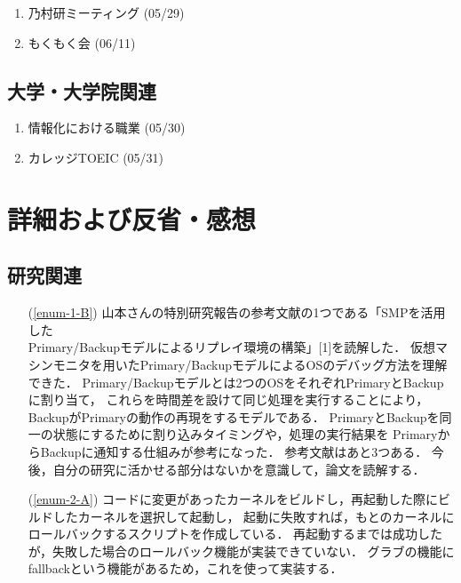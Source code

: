 \documentclass[fleqn, 14pt]{extarticle}
\begin{document}
\begin{enumerate}
\item 乃村研ミーティング
\hfill
\label{enum-laboratory1}
(05/29)
\item もくもく会
\hfill
\label{enum-laboratory4}
(06/11)
\end{enumerate}

\subsection{大学・大学院関連}
\label{sec-2-3}

\begin{enumerate}
\item 情報化における職業
\hfill
\label{enum-univ1}
(05/30)
\item カレッジTOEIC
\hfill
\label{enum-univ2}
(05/31)
\end{enumerate}





\section{詳細および反省・感想}
\label{sec-3}
\subsection{研究関連}
\label{sec-3-1}

\begin{itemize}
\item[(\ref{enum-1-B})]
山本さんの特別研究報告の参考文献の1つである「SMPを活用した \\
Primary/Backupモデルによるリプレイ環境の構築」[1]を読解した．
仮想マシンモニタを用いたPrimary/BackupモデルによるOSのデバッグ方法を理解できた．
Primary/Backupモデルとは2つのOSをそれぞれPrimaryとBackupに割り当て，
これらを時間差を設けて同じ処理を実行することにより，BackupがPrimaryの動作の再現をするモデルである．
PrimaryとBackupを同一の状態にするために割り込みタイミングや，処理の実行結果を
PrimaryからBackupに通知する仕組みが参考になった．
参考文献はあと3つある．
今後，自分の研究に活かせる部分はないかを意識して，論文を読解する．

\item[(\ref{enum-2-A})]
コードに変更があったカーネルをビルドし，再起動した際にビルドしたカーネルを選択して起動し，
起動に失敗すれば，もとのカーネルにロールバックするスクリプトを作成している．
再起動するまでは成功したが，失敗した場合のロールバック機能が実装できていない．
グラブの機能にfallbackという機能があるため，これを使って実装する．

\end{itemize}
\end{document}
